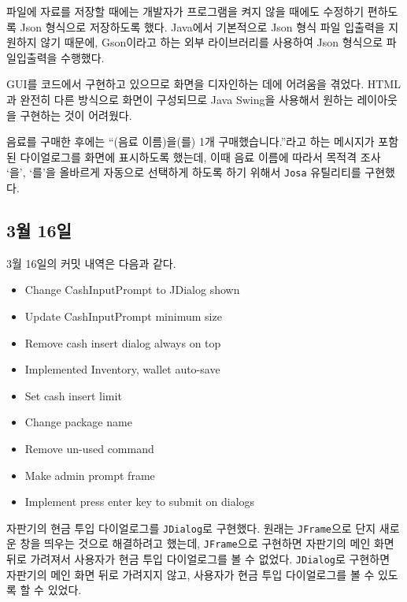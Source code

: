\documentclass{oblivoir}
\begin{document}
    파일에 자료를 저장할 때에는 개발자가 프로그램을 켜지 않을 때에도 수정하기 편하도록 Json 형식으로 저장하도록 했다.
    Java에서 기본적으로 Json 형식 파일 입출력을 지원하지 않기 때문에, Gson이라고 하는 외부 라이브러리를 사용하여
    Json 형식으로 파일입출력을 수행했다.

    GUI를 코드에서 구현하고 있으므로 화면을 디자인하는 데에 어려움을 겪었다.
    HTML과 완전히 다른 방식으로 화면이 구성되므로 Java Swing을 사용해서 원하는 레이아웃을 구현하는 것이 어려웠다.

    음료를 구매한 후에는 ``(음료 이름)을(를) 1개 구매했습니다.''라고 하는 메시지가 포함된
    다이얼로그를 화면에 표시하도록 했는데, 이때 음료 이름에 따라서 목적격 조사 `을', `를'을 올바르게 자동으로 선택하게 하도록 하기 위해서
    \texttt{Josa} 유틸리티를 구현했다.

    \subsection{3월 16일}

    3월 16일의 커밋 내역은 다음과 같다.
    \begin{itemize}
        \item Change CashInputPrompt to JDialog shown
        \item Update CashInputPrompt minimum size
        \item Remove cash insert dialog always on top
        \item Implemented Inventory, wallet auto-save
        \item Set cash insert limit
        \item Change package name
        \item Remove un-used command
        \item Make admin prompt frame
        \item Implement press enter key to submit on dialogs
    \end{itemize}

    자판기의 현금 투입 다이얼로그를 \texttt{JDialog}로 구현했다.
    원래는 \texttt{JFrame}으로 단지 새로운 창을 띄우는 것으로 해결하려고 했는데,
    \texttt{JFrame}으로 구현하면 자판기의 메인 화면 뒤로 가려져서 사용자가 현금 투입 다이얼로그를 볼 수 없었다.
    \texttt{JDialog}로 구현하면 자판기의 메인 화면 뒤로 가려지지 않고, 사용자가 현금 투입 다이얼로그를 볼 수 있도록 할 수 있었다.
\end{document}
